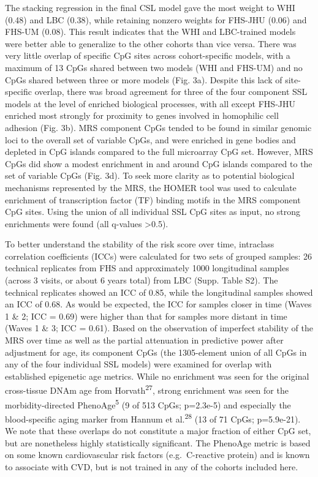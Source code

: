 \documentclass[]{article}
\begin{document}
The stacking regression in the final CSL model gave the most weight to
WHI (0.48) and LBC (0.38), while retaining nonzero weights for FHS-JHU
(0.06) and FHS-UM (0.08). This result indicates that the WHI and
LBC-trained models were better able to generalize to the other cohorts
than vice versa. There was very little overlap of specific CpG sites
across cohort-specific models, with a maximum of 13 CpGs shared between
two models (WHI and FHS-UM) and no CpGs shared between three or more
models (Fig. 3a). Despite this lack of site-specific overlap, there was
broad agreement for three of the four component SSL models at the level
of enriched biological processes, with all except FHS-JHU enriched most
strongly for proximity to genes involved in homophilic cell adhesion
(Fig. 3b). MRS component CpGs tended to be found in similar genomic loci
to the overall set of variable CpGs, and were enriched in gene bodies
and depleted in CpG islands compared to the full microarray CpG set.
However, MRS CpGs did show a modest enrichment in and around CpG islands
compared to the set of variable CpGs (Fig. 3d). To seek more clarity as
to potential biological mechanisms represented by the MRS, the HOMER
tool was used to calculate enrichment of transcription factor (TF)
binding motifs in the MRS component CpG sites. Using the union of all
individual SSL CpG sites as input, no strong enrichments were found (all
q-values \textgreater{}0.5).

To better understand the stability of the risk score over time,
intraclass correlation coefficients (ICCs) were calculated for two sets
of grouped samples: 26 technical replicates from FHS and approximately
1000 longitudinal samples (across 3 visits, or about 6 years total) from
LBC (Supp. Table S2). The technical replicates showed an ICC of 0.85,
while the longitudinal samples showed an ICC of 0.68. As would be
expected, the ICC for samples closer in time (Waves 1 \& 2; ICC = 0.69)
were higher than that for samples more distant in time (Waves 1 \& 3;
ICC = 0.61). Based on the observation of imperfect stability of the MRS
over time as well as the partial attenuation in predictive power after
adjustment for age, its component CpGs (the 1305-element union of all
CpGs in any of the four individual SSL models) were examined for overlap
with established epigenetic age metrics. While no enrichment was seen
for the original cross-tissue DNAm age from Horvath\textsuperscript{27},
strong enrichment was seen for the morbidity-directed
PhenoAge\textsuperscript{5} (9 of 513 CpGs; p=2.3e-5) and especially the
blood-specific aging marker from Hannum et al.\textsuperscript{28} (13
of 71 CpGs; p=5.9e-21). We note that these overlaps do not constitute a
major fraction of either CpG set, but are nonetheless highly
statistically significant. The PhenoAge metric is based on some known
cardiovascular risk factors (e.g.~C-reactive protein) and is known to
associate with CVD, but is not trained in any of the cohorts included
here.
\end{document}
